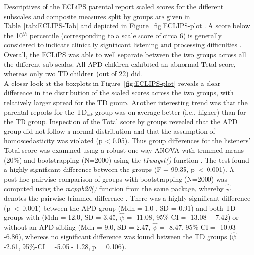 \documentclass[a4paper, twoside]{templates/ociamthesis}
\begin{document}
Descriptives of the ECLiPS parental report scaled scores for the different subscales and composite measures split by groups are given in Table~\ref{tab:ECLIPS-Tab} and depicted in Figure~\ref{fig:ECLIPS-plot}. A score below the 10\(^{th}\) percentile (corresponding to a scale score of circa 6) is generally considered to indicate clinically significant listening and processing difficulties \autocite{Barry2014}. Overall, the ECLiPS was able to well separate between the two groups across all the different sub-scales. All APD children exhibited an abnormal Total score, whereas only two TD children (out of 22) did.\\

A closer look at the boxplots in Figure~\ref{fig:ECLIPS-plot} reveals a clear difference in the distribution of the scaled scores across the two groups, with relatively larger spread for the TD group. Another interesting trend was that the parental reports for the TD\(_{sib}\) group was on average better (i.e., higher) than for the TD group. Inspection of the Total score by groups revealed that the APD group did not follow a normal distribution and that the assumption of homoscedasticity was violated (p \textless{} 0.05). Thus group differences for the listeners' Total score was examined using a robust one-way ANOVA with trimmed means (20\%) and bootstrapping (N=2000) using the \emph{t1waybt()} function \autocite[WRS2 package;][]{WRS2PackageR}. The test found a highly significant difference between the groups (F = 99.35, p~\textless~0.001). A post-hoc pairwise comparison of groups with bootstrapping (N=2000) was computed using the \emph{mcppb20()} function from the same package, whereby \(\hat{\psi}\) denotes the pairwise trimmed difference \autocite{WRS2PackageR}. There was a highly significant difference (p~\textless~0.001) between the APD group (Mdn = 1.0 , SD = 0.91) and both TD groups with (Mdn = 12.0, SD = 3.45, \(\hat{\psi}\) = -11.08, 95\%-CI = -13.08 - -7.42) or without an APD sibling (Mdn = 9.0, SD = 2.47, \(\hat{\psi}\) = -8.47, 95\%-CI = -10.03 - -6.86), whereas no significant difference was found between the TD groups (\(\hat{\psi}\) = -2.61, 95\%-CI = -5.05 - 1.28, p = 0.106).\\
\end{document}
